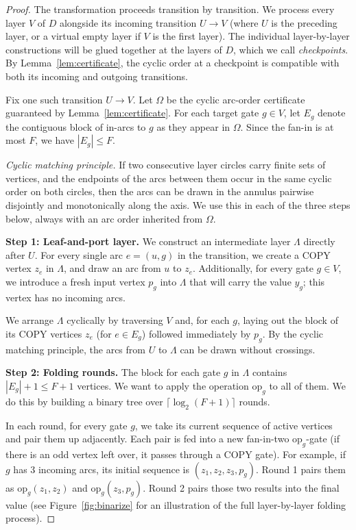 \documentclass[11pt]{article}
\theoremstyle{definition}
\theoremstyle{remark}
\begin{document}
\begin{proof}
The transformation proceeds transition by transition. We process every layer $V$ of $D$ alongside its incoming transition $U\to V$ (where $U$ is the preceding layer, or a virtual empty layer if $V$ is the first layer). The individual layer-by-layer constructions will be glued together at the layers of $D$, which we call \emph{checkpoints}. By Lemma~\ref{lem:certificate}, the cyclic order at a checkpoint is compatible with both its incoming and outgoing transitions.

Fix one such transition $U \to V$. Let $\Omega$ be the cyclic arc-order certificate guaranteed by Lemma~\ref{lem:certificate}. For each target gate $g\in V$, let $E_g$ denote the contiguous block of in-arcs to $g$ as they appear in $\Omega$. Since the fan-in is at most $F$, we have $|E_g|\le F$.

\emph{Cyclic matching principle.} If two consecutive layer circles carry finite sets of
vertices, and the endpoints of the arcs between them occur in the same cyclic order on
both circles, then the arcs can be drawn in the annulus pairwise disjointly and
monotonically along the axis. We use this in each of the three steps below, always with
an arc order inherited from $\Omega$.

\textbf{Step 1: Leaf-and-port layer.} We construct an intermediate layer $\Lambda$ directly after $U$. For every single arc $e=(u,g)$ in the transition, we create a $\mathrm{COPY}$ vertex $z_e$ in $\Lambda$, and draw an arc from $u$ to $z_e$. Additionally, for every gate $g\in V$, we introduce a fresh input vertex $p_g$ into $\Lambda$ that will carry the value $y_g$; this vertex has no incoming arcs.

We arrange $\Lambda$ cyclically by traversing $V$ and, for each $g$, laying out the block of its $\mathrm{COPY}$ vertices $z_e$ (for $e \in E_g$) followed immediately by $p_g$. By the cyclic matching principle, the arcs from $U$ to $\Lambda$ can be drawn without crossings.

\textbf{Step 2: Folding rounds.} The block for each gate $g$ in $\Lambda$ contains $|E_g|+1 \le F+1$ vertices. We want to apply the operation $\mathrm{op}_g$ to all of them. We do this by building a binary tree over $\lceil\log_2(F+1)\rceil$ rounds.

In each round, for every gate $g$, we take its current sequence of active vertices and pair them up adjacently. Each pair is fed into a new fan-in-two $\mathrm{op}_g$-gate (if there is an odd vertex left over, it passes through a $\mathrm{COPY}$ gate). For example, if $g$ has 3 incoming arcs, its initial sequence is $(z_1, z_2, z_3, p_g)$. Round 1 pairs them as $\mathrm{op}_g(z_1,z_2)$ and $\mathrm{op}_g(z_3,p_g)$. Round 2 pairs those two results into the final value (see Figure~\ref{fig:binarize} for an illustration of the full layer-by-layer folding process).


\end{proof}
\end{document}

